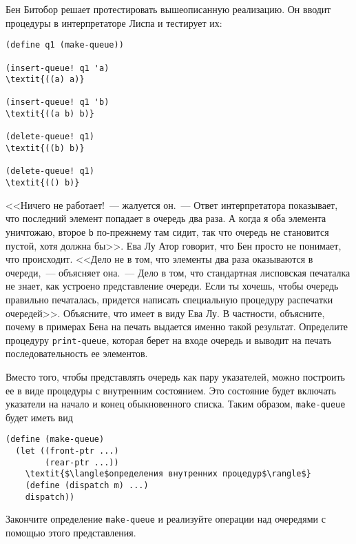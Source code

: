 \begin{cntrfig}

\caption{ Результат применения {\tt (delete-queue!
q)} к очереди с рис.~\ref{P3.20}.}
\label{P3.21}

\end{cntrfig}
\begin{exercise}{3.21}\label{EX3.21}%
Бен Битобор решает протестировать вышеописанную
реализацию.  Он вводит процедуры в интерпретаторе Лиспа и тестирует их:

\begin{Verbatim}[fontsize=\small]
(define q1 (make-queue))

(insert-queue! q1 'a)
\textit{((a) a)}

(insert-queue! q1 'b)
\textit{((a b) b)}

(delete-queue! q1)
\textit{((b) b)}

(delete-queue! q1)
\textit{(() b)}
\end{Verbatim}
<<Ничего не работает!~--- жалуется он.~--- Ответ интерпретатора показывает,
что последний элемент попадает в очередь два раза.  А когда я оба
элемента уничтожаю, второе {\tt b} по-прежнему там сидит, так
что очередь не становится пустой, хотя должна бы>>. Ева Лу Атор
говорит, что Бен просто не понимает, что происходит. <<Дело не в том,
что элементы два раза оказываются в очереди,~--- объясняет
она.~--- Дело в том, что стандартная лисповская печаталка не знает, как устроено
представление очереди.  Если ты хочешь, чтобы очередь правильно
печаталась, придется написать специальную процедуру распечатки
очередей>>. Объясните, что имеет в виду Ева Лу.  В частности,
объясните, почему в примерах Бена на печать выдается именно такой
результат. Определите процедуру  
{\tt print-queue}, которая
берет на входе очередь и выводит на печать последовательность ее
элементов.
\end{exercise}
\begin{exercise}{3.22}\label{EX3.22}%
%
Вместо того, чтобы представлять очередь как пару
указателей, можно построить ее в виде процедуры с внутренним
состоянием.  Это состояние будет включать указатели на начало и конец
обыкновенного списка.  Таким образом, {\tt make-queue} будет
иметь вид

\begin{Verbatim}[fontsize=\small]
(define (make-queue)
  (let ((front-ptr ...)
        (rear-ptr ...))
    \textit{$\langle$определения внутренних процедур$\rangle$}
    (define (dispatch m) ...)
    dispatch))
\end{Verbatim}
Закончите определение {\tt make-queue} и реализуйте операции
над очередями с помощью этого представления.
\end{exercise}
